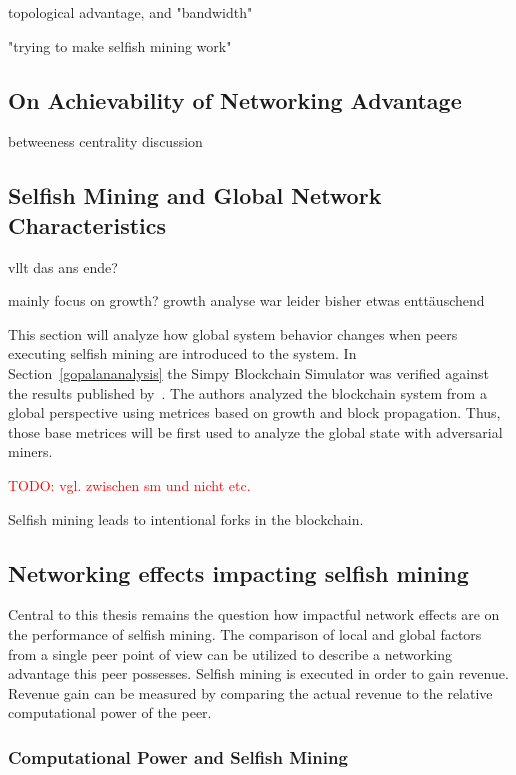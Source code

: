 topological advantage, and "bandwidth"

"trying to make selfish mining work"
\subsection{On Achievability of Networking Advantage}
betweeness centrality discussion
\subsection{Selfish Mining and Global Network Characteristics}
vllt das ans ende?	

mainly focus on growth? growth analyse war leider bisher etwas enttäuschend

This section will analyze how global system behavior changes when peers executing selfish mining are introduced to the system. In Section~\ref{gopalananalysis} the Simpy Blockchain Simulator was verified against the results published by~. The authors analyzed the blockchain system from a global perspective using metrices based on growth and block propagation. Thus, those base metrices will be first used to analyze the global state with adversarial miners.

\textcolor{red}{TODO: vgl. zwischen sm und nicht etc.}

Selfish mining leads to intentional forks in the blockchain.

  






\subsection{Networking effects impacting selfish mining}
Central to this thesis remains the question how impactful network effects are on the performance of selfish mining. The comparison of local and global factors from a single peer point of view can be utilized to describe a networking advantage this peer possesses.
Selfish mining is executed in order to gain revenue. Revenue gain can be measured by comparing the actual revenue to the relative computational power of the peer.
\subsubsection{Computational Power and Selfish Mining}


